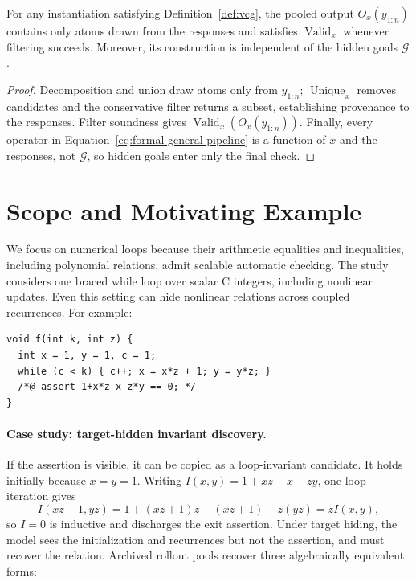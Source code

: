 \begin{proposition}
\label{prop:composable-transfer}
For any instantiation satisfying Definition~\ref{def:vcg}, the pooled output
\(O_x(y_{1:n})\) contains only atoms drawn from the responses and satisfies
\(\operatorname{Valid}_x\) whenever filtering succeeds.  Moreover, its
construction is independent of the hidden goals \(\mathcal G\).
\end{proposition}

\begin{proof}
Decomposition and union draw atoms only from \(y_{1:n}\);
\(\operatorname{Unique}_x\) removes candidates and the conservative filter
returns a subset, establishing provenance to the responses.  Filter soundness
gives \(\operatorname{Valid}_x(O_x(y_{1:n}))\).  Finally, every operator in
Equation~\eqref{eq:formal-general-pipeline} is a function of \(x\) and the
responses, not \(\mathcal G\), so hidden goals enter only the final check.
\end{proof}

\section{Scope and Motivating Example}
\label{app:scope-example}

We focus on numerical loops because their arithmetic equalities and
inequalities, including polynomial relations, admit scalable automatic
checking.  The study considers one braced while loop over scalar C integers,
including nonlinear updates.  Even this setting can hide nonlinear relations
across coupled recurrences.  For example:
\begin{lstlisting}
void f(int k, int z) {
  int x = 1, y = 1, c = 1;
  while (c < k) { c++; x = x*z + 1; y = y*z; }
  /*@ assert 1+x*z-x-z*y == 0; */
}
\end{lstlisting}

\paragraph{Case study: target-hidden invariant discovery.}
If the assertion is visible, it can be copied as a loop-invariant candidate.
It holds initially because \(x=y=1\).  Writing
\(I(x,y)=1+xz-x-zy\), one loop iteration gives
\[
  I(xz+1,yz)
  =1+(xz+1)z-(xz+1)-z(yz)
  =zI(x,y),
\]
so \(I=0\) is inductive and discharges the exit assertion.  Under target
hiding, the model sees the initialization and recurrences but not the
assertion, and must recover the relation.  Archived rollout pools recover
three algebraically equivalent forms:

